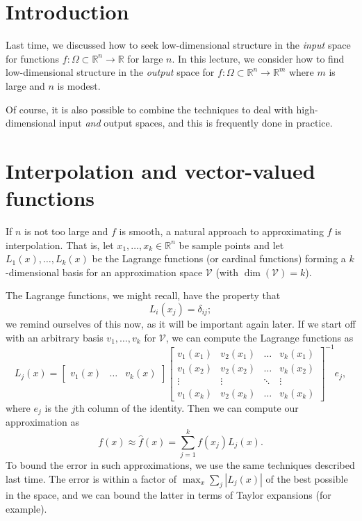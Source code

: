 \documentclass[12pt, leqno]{article} %
\begin{document}

\section{Introduction}

Last time, we discussed how to seek low-dimensional structure in the
{\em input} space for functions $f : \Omega \subset \mathbb{R}^n
\rightarrow \mathbb{R}$ for large $n$.  In this lecture, we consider
how to find low-dimensional structure in the {\em output} space for
$f : \Omega \subset \mathbb{R}^n \rightarrow \mathbb{R}^m$ where $m$ is
large and $n$ is modest.

Of course, it is also possible to combine the techniques to deal with
high-dimensional input {\em and} output spaces, and this is frequently
done in practice.


\section{Interpolation and vector-valued functions}

If $n$ is not too large and $f$ is smooth, a natural approach to
approximating $f$ is interpolation.  That is, let
$x_1, \ldots, x_k \in \mathbb{R}^n$ be sample points and let
$L_1(x), \ldots, L_k(x)$ be the Lagrange functions (or cardinal
functions) forming a $k$-dimensional basis for an approximation
space $\mathcal{V}$ (with $\dim(\mathcal{V}) = k$).

The Lagrange functions, we might recall, have the property that
\[
  L_i(x_j) = \delta_{ij};
\]
we remind ourselves of this now, as it will be important again later.
If we start off with an arbitrary basis $v_1, \ldots, v_k$ for
$\mathcal{V}$, we can compute the Lagrange functions as
\[
L_j(x) = 
  \begin{bmatrix} v_1(x) & \ldots & v_k(x) \end{bmatrix}
  \begin{bmatrix}
    v_1(x_1) & v_2(x_1) & \ldots & v_k(x_1) \\
    v_1(x_2) & v_2(x_2) & \ldots & v_k(x_2) \\
    \vdots & \vdots & \ddots & \vdots \\
    v_1(x_k) & v_2(x_k) & \ldots & v_k(x_k)
  \end{bmatrix}^{-1} e_j,
\]
where $e_j$ is the $j$th column of the identity.
Then we can compute our approximation as
\[
  f(x) \approx \hat{f}(x) = \sum_{j=1}^k f(x_j) L_j(x).
\]
To bound the error in such approximations, we use the same techniques
described last time.  The error is within a factor of $\max_x \sum_j
|L_j(x)|$ of the best possible in the space, and we can bound the
latter in terms of Taylor expansions (for example).
\end{document}
